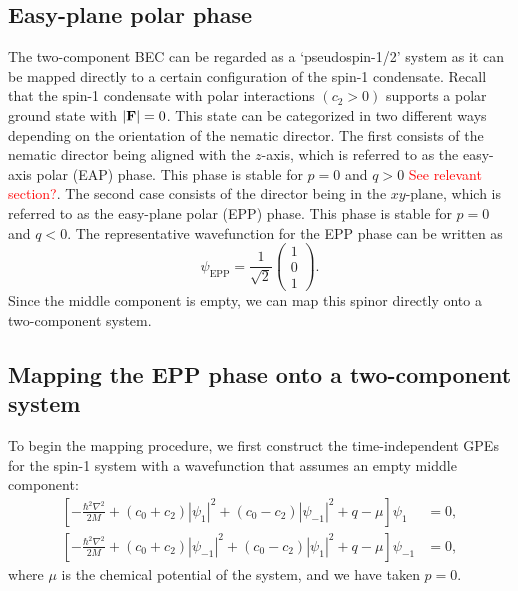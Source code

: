 \subsection{Easy-plane polar phase}\label{subsec:easy-plane-polar-phase}
The two-component BEC can be regarded as a `pseudospin-1/2' system as it can be
mapped directly to a certain configuration of the spin-1 condensate.
Recall that the spin-1 condensate with polar interactions $(c_2 > 0)$ supports a
polar ground state with $|\vb{F}|=0$.
This state can be categorized in two different ways depending on the orientation
of the nematic director.
The first consists of the nematic director being aligned with the $z$-axis,
which is referred to as the easy-axis polar (EAP) phase.
This phase is stable for $p=0$ and $q>0$ \textcolor{red}{See relevant section?}.
The second case consists of the director being in the $xy$-plane, which is
referred to as the easy-plane polar (EPP) phase.
This phase is stable for $p=0$ and $q<0$.
The representative wavefunction for the EPP phase can be written as
\begin{equation}
    \psi_\mathrm{EPP} = \frac{1}{\sqrt{2}}\begin{pmatrix}
        1 \\ 0 \\ 1
    \end{pmatrix}.
    \label{eq:EPP_wavefunction}
\end{equation}
Since the middle component is empty, we can map this spinor directly onto a
two-component system.

\subsection{Mapping the EPP phase onto a two-component system}\label{subsec:mapping-the-epp-phase-onto-a-two-component-system}
To begin the mapping procedure, we first construct the time-independent
GPEs for the spin-1 system with a wavefunction that assumes an empty middle
component:
\begin{equation}
    \begin{aligned}
        \left[-\frac{\hbar^2\nabla^2}{2M}
        + (c_0 + c_2)|\psi_1|^2 + (c_0 - c_2)|\psi_{-1}|^2 
        + q - \mu\right]\psi_1 &= 0, \\
        \left[-\frac{\hbar^2\nabla^2}{2M}
        + (c_0 + c_2)|\psi_{-1}|^2 + (c_0 - c_2)|\psi_1|^2 
        + q - \mu\right]\psi_{-1} &= 0,
    \end{aligned}
    \label{eq:EPP-time-independent-GPEs}
\end{equation}
where $\mu$ is the chemical potential of the system, and we have taken $p=0$.

